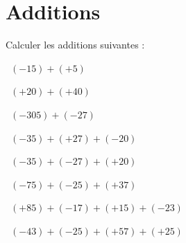 
	\section{Additions}
	
	Calculer les additions suivantes :
	\begin{questions}
	
		\question[1]  $(-15) + (+ 5)$
		\fillwithdottedlines{1cm}
		\begin{solution}
			
		\end{solution}
	
		\question[1]  $(+20) + (+ 40)$
		\fillwithdottedlines{1cm}
		\begin{solution}
			
		\end{solution}
	
	
		
	
		\question[1]  $(-305) + (-27)$
		\fillwithdottedlines{1cm}
		\begin{solution}
			
		\end{solution}
	
	
		\question[1]  $(-35) + (+27)  + (-20)$
		\fillwithdottedlines{1.5cm}
		\begin{solution}
			
		\end{solution}
	
	
		\question[2]  $(-35) + (-27)  + (+20)$
		\fillwithdottedlines{1.5cm}
		\begin{solution}
			
		\end{solution}
	
	
	
	
		\question[2]  $(-75) + (-25) + (+37)$
		\fillwithdottedlines{1.5cm}
		\begin{solution}
			
		\end{solution}
	
	
		\question[2]  $(+85) + (-17) + (+15) + (-23)$ 
		\fillwithdottedlines{2cm}
		\begin{solution}
			
		\end{solution}
	
	
		\question[2]  $(-43) + (-25) + (+57) + (+25)$ 
		\fillwithdottedlines{2cm}
		\begin{solution}
			
		\end{solution}
	\end{questions}
	
